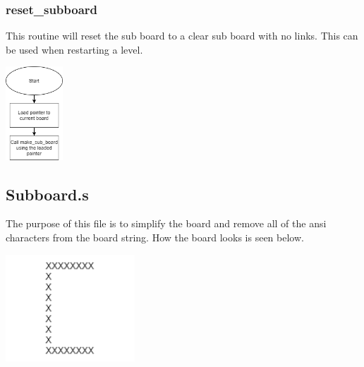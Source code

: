 \documentclass{article}
\begin{document}
    \subsubsection{reset\_subboard}
        This routine will reset the sub board to a clear sub board with no links. 
        This can be used when restarting a level.
        \begin{center}
            {\includegraphics[height=3.5cm]{reset_subboard.png}\centering} 
        \end{center}

    \newpage


\subsection{Subboard.s}
        The purpose of this file is to simplify the board and remove
        all of the ansi characters from the board string.  How the 
        board looks is seen below.
        \begin{center}
            {\includegraphics[height=4cm]{subboard.png}\centering} 
        \end{center}
\end{document}
